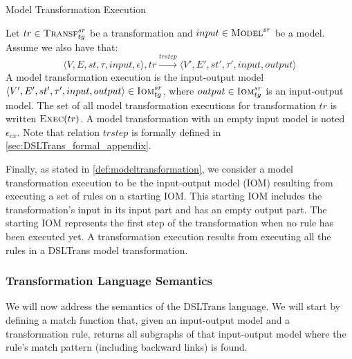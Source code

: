
\begin{definition} {Model Transformation Execution\\}
\label{def:modeltransformation} 

Let  $tr\in \textsc{Transf}^{sr}_{tg}$ be a transformation and $input \in \textsc{Model}^{sr}$ be a model. Assume we also have that: $$\langle V,E,st,\tau,input,\epsilon\rangle,tr \xrightarrow{trstep} \langle V',E',st',\tau',input,output\rangle$$
A model transformation execution is the input-output model $\langle V',E',st',\tau',input,output\rangle\in \textsc{Iom}^{sr}_{tg}$, where $output\in \textsc{Iom}^{sr}_{tg}$ is an input-output model. The set of all model transformation executions for transformation $tr$ is written $\textsc{Exec}(tr)$. A model transformation with an empty input model is noted $\epsilon_{ex}$. Note that relation $trstep$ is formally defined in \cref{sec:DSLTrans_formal_appendix}.
\end{definition}


Finally, as stated in \cref{def:modeltransformation}, we consider a model transformation execution to be the input-output model (IOM) resulting from executing a set of rules on a starting IOM. This starting IOM includes the transformation's input in its input part and has an empty output part. The starting IOM represents the first step of the transformation when no rule has been executed yet. A transformation execution results from executing all the rules in a DSLTrans model transformation.

\subsubsection{Transformation Language Semantics}

We will now address the semantics of the DSLTrans language. We will start by defining a match function that, given an input-output model and a transformation rule, returns all subgraphs of that input-output model where the rule's match pattern (including backward links) is found.  


